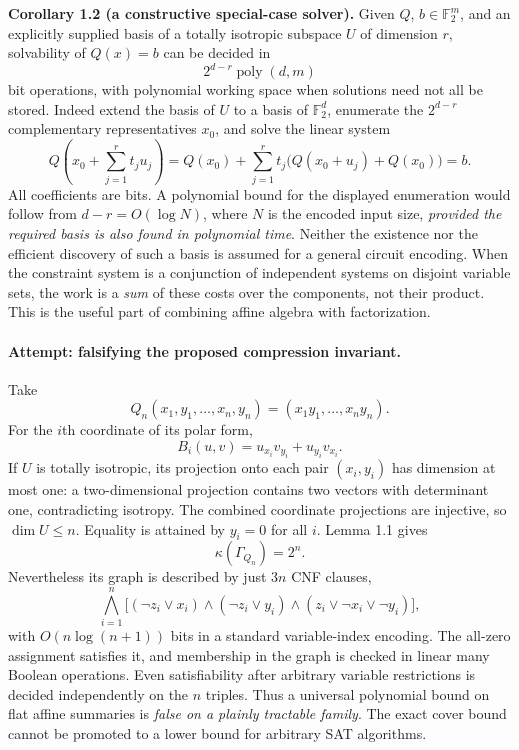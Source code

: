 \documentclass[11pt]{article}
\newcommand{\F}{\mathbb{F}}
\begin{document}
\medskip
\textbf{Corollary 1.2 (a constructive special-case solver).}
Given $Q$, $b\in\F_2^m$, and an explicitly supplied basis of a totally isotropic
subspace $U$ of dimension $r$, solvability of $Q(x)=b$ can be decided in
\begin{equation}\label{ra:1:algorithm}
             2^{d-r}\operatorname{poly}(d,m)
\end{equation}
bit operations, with polynomial working space when solutions need not all be
stored. Indeed extend the basis of $U$ to a basis of $\F_2^d$, enumerate the
$2^{d-r}$ complementary representatives $x_0$, and solve the linear system
\[
 Q\!\left(x_0+\sum_{j=1}^r t_ju_j\right)
   =Q(x_0)+\sum_{j=1}^r t_j\bigl(Q(x_0+u_j)+Q(x_0)\bigr)=b.
\]
All coefficients are bits. A polynomial bound for the displayed enumeration
would follow from $d-r=O(\log N)$, where $N$ is the encoded input size,
\emph{provided the required basis is also found in polynomial time}. Neither
the existence nor the efficient discovery of such a basis is assumed for a
general circuit encoding. When the constraint system is a conjunction of
independent systems on disjoint variable sets, the work is a \emph{sum} of
these costs over the components, not their product. This is the useful part
of combining affine algebra with factorization.

\paragraph{Attempt: falsifying the proposed compression invariant.}
Take
\[
 Q_n(x_1,y_1,\ldots,x_n,y_n)=(x_1y_1,\ldots,x_ny_n).
\]
For the $i$th coordinate of its polar form,
\[
 B_i(u,v)=u_{x_i}v_{y_i}+u_{y_i}v_{x_i}.
\]
If $U$ is totally isotropic, its projection onto each pair $(x_i,y_i)$ has
dimension at most one: a two-dimensional projection contains two vectors
with determinant one, contradicting isotropy. The combined coordinate
projections are injective, so $\dim U\le n$. Equality is attained by $y_i=0$
for all $i$. Lemma 1.1 gives
\begin{equation}\label{ra:1:andcover}
                        \kappa(\Gamma_{Q_n})=2^n.
\end{equation}
Nevertheless its graph is described by just $3n$ CNF clauses,
\[
 \bigwedge_{i=1}^n
  \bigl[(\neg z_i\vee x_i)\wedge(\neg z_i\vee y_i)
        \wedge(z_i\vee\neg x_i\vee\neg y_i)\bigr],
\]
with $O(n\log(n+1))$ bits in a standard variable-index encoding. The all-zero
assignment satisfies it, and membership in the graph is checked in linear
many Boolean operations. Even satisfiability after arbitrary variable
restrictions is decided independently on the $n$ triples. Thus a universal
polynomial bound on flat affine summaries is \emph{false on a plainly
tractable family}. The exact cover bound cannot be promoted to a lower bound
for arbitrary SAT algorithms.
\end{document}

